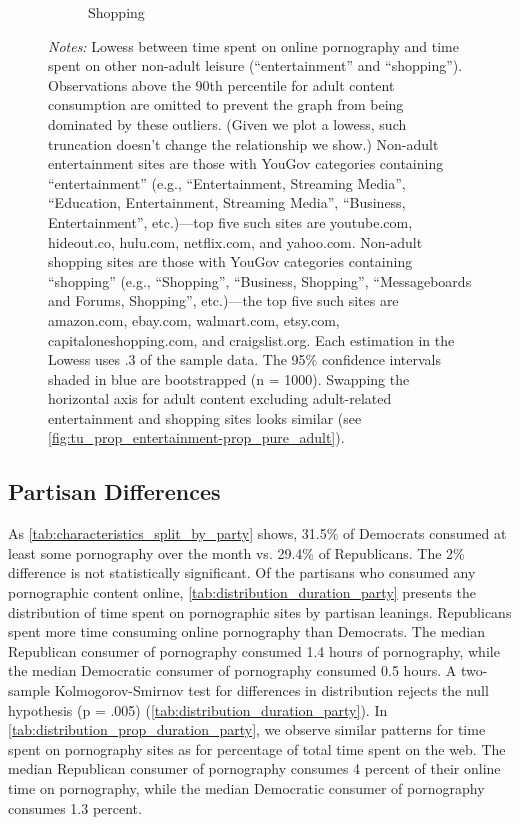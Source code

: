 \documentclass[12pt, letterpaper]{article}
\begin{document}
\begin{figure}[ht]
\begin{subfigure}[b]{0.495\textwidth}
         \caption{Shopping}
     \end{subfigure}
\caption*{\footnotesize \emph{Notes:} Lowess between time spent on online pornography and time spent on other non-adult leisure (``entertainment'' and ``shopping''). Observations above the 90th percentile for adult content consumption are omitted to prevent the graph from being dominated by these outliers. (Given we plot a lowess, such truncation doesn't change the relationship we show.) Non-adult entertainment sites are those with YouGov categories containing ``entertainment'' (e.g., ``Entertainment, Streaming Media'', ``Education, Entertainment, Streaming Media'', ``Business, Entertainment'', etc.)---top five such sites are youtube.com, hideout.co, hulu.com, netflix.com, and yahoo.com. Non-adult shopping sites are those with YouGov categories containing ``shopping'' (e.g., ``Shopping'', ``Business, Shopping'', ``Messageboards and Forums, Shopping'', etc.)---the top five such sites are amazon.com, ebay.com, walmart.com, etsy.com, capitaloneshopping.com, and craigslist.org. Each estimation in the Lowess uses .3 of the sample data.
 The 95\% confidence intervals shaded in blue are bootstrapped (n = 1000). Swapping the horizontal axis for adult content excluding adult-related entertainment and shopping sites looks similar (see \cref{fig:tu_prop_entertainment-prop_pure_adult}). 
}
\end{figure}

\subsection{Partisan Differences}
\label{subsec:partisan_differences}
As \cref{tab:characteristics_split_by_party} shows, 31.5\% of Democrats consumed at least some pornography over the month vs. 29.4\% of Republicans. The 2\% difference is not statistically significant. Of the partisans who consumed any pornographic content online, \cref{tab:distribution_duration_party} presents the distribution of time spent on pornographic sites by partisan leanings. Republicans spent more time consuming online pornography than Democrats. The median Republican consumer of pornography consumed 1.4 hours of pornography, while the median Democratic consumer of pornography consumed 0.5 hours. A two-sample Kolmogorov-Smirnov test for differences in distribution rejects the null hypothesis (p = .005) (\cref{tab:distribution_duration_party}). In \cref{tab:distribution_prop_duration_party}, we observe similar patterns for time spent on pornography sites as for percentage of total time spent on the web. The median Republican consumer of pornography consumes 4 percent of their online time on pornography, while the median Democratic consumer of pornography consumes 1.3 percent.
\end{document}
